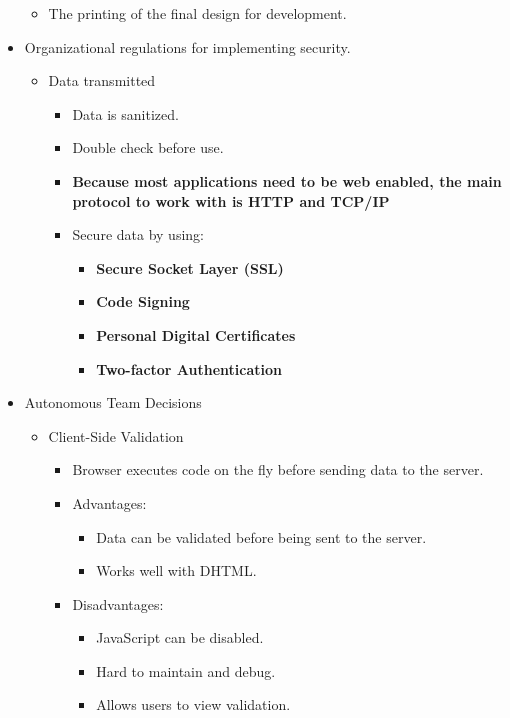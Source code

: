 \documentclass[12pt]{article}
\begin{document}
\begin{itemize}
\begin{itemize}
			\item The printing of the final design for development.
		\end{itemize}
	\item Organizational regulations for implementing security.
		\begin{itemize}
			\item Data transmitted
				\begin{itemize}
					\item Data is sanitized.
					\item Double check before use.
					\item \textbf{Because most applications need to be web enabled,
						the main protocol to work with is HTTP and TCP/IP}
					\item Secure data by using:
						\begin{itemize}
							\item \textbf{Secure Socket Layer (SSL)}
							\item \textbf{Code Signing}
							\item \textbf{Personal Digital Certificates}
							\item \textbf{Two-factor Authentication}
						\end{itemize}
				\end{itemize}
		\end{itemize}
	\item Autonomous Team Decisions
		\begin{itemize}
			\item Client-Side Validation
				\begin{itemize}
					\item Browser executes code on the fly before sending data to
						the server.
					\item Advantages:
						\begin{itemize}
							\item Data can be validated before being sent to
								the server.
							\item Works well with DHTML.
						\end{itemize}
					\item Disadvantages:
						\begin{itemize}
							\item JavaScript can be disabled.
							\item Hard to maintain and debug.
							\item Allows users to view validation.
						\end{itemize}

\end{itemize}
\end{itemize}
\end{itemize}
\end{document}
